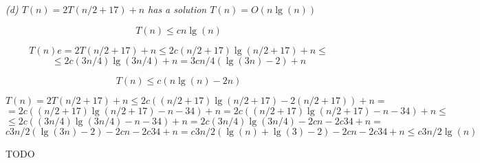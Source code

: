 \documentclass[11pt,oneside,titlepage]{book}
\begin{document}
\textit{(d) $T(n) = 2T(n/2 + 17) + n$ has a solution $T(n) = O(n \lg(n))$}

$$T(n) \leq c n \lg(n)$$

$$T(n) e= 2 T(n/2 + 17) + n \leq 2 c (n/2 + 17) \lg(n/2 + 17) + n  \leq$$
$$ \leq
 2 c (3n/4) \lg(3n/4) + n  = 3cn/4 (\lg(3n) - 2) + n
$$

$$T(n) \leq c (n \lg(n) - 2n)$$

$$T(n) = 2 T(n/2 + 17) + n \leq 2 c ((n/2 + 17) \lg(n/2 + 17) - 2(n/2 + 17)) + n  = $$
$$ =
2 c ((n/2 + 17) \lg(n/2 + 17) - n - 34) + n  = 2 c ((n/2 + 17) \lg(n/2 + 17) - n - 34) + n \leq
$$
$$ \leq 2 c ((3n/4) \lg(3n/4) - n - 34) + n = 2 c (3n/4) \lg(3n/4) - 2 c n - 2 c 34 + n = $$
$$   c 3n/2  (\lg(3n) - 2) - 2 c n - 2 c 34 + n =
c 3n/2  (\lg(n) + \lg(3) - 2) - 2 c n - 2 c 34 + n \leq c 3n/2 \lg(n)$$

TODO
\end{document}
